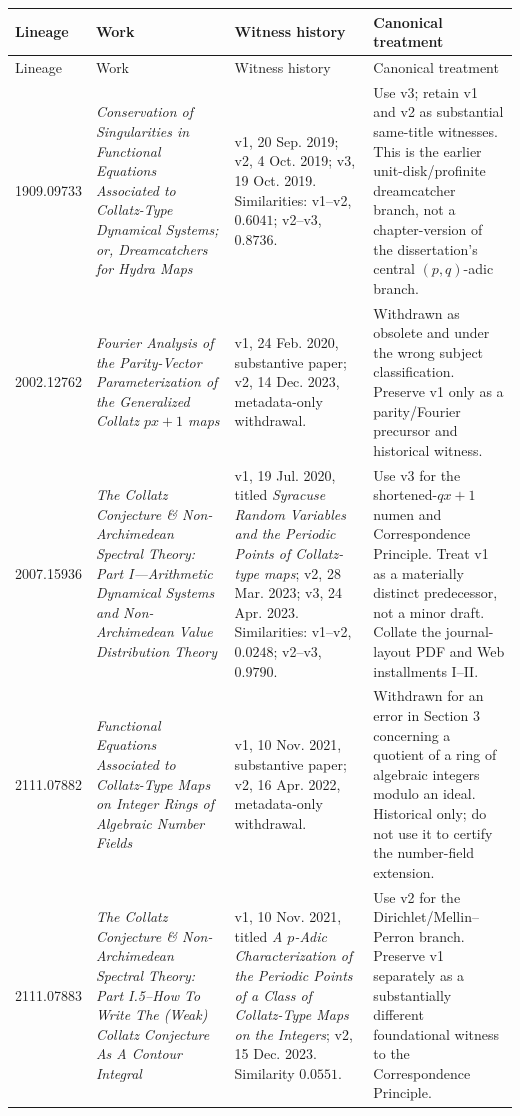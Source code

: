 \begingroup\small
\setlength{\tabcolsep}{3pt}
\begin{longtable}{@{}p{}p{}p{}p{}@{}}
\toprule
Lineage & Work & Witness history & Canonical treatment\\
\midrule
\endfirsthead
\toprule
Lineage & Work & Witness history & Canonical treatment\\
\midrule
\endhead
1909.09733 & \emph{Conservation of Singularities in Functional Equations Associated to Collatz-Type Dynamical Systems; or, Dreamcatchers for Hydra Maps}
& v1, 20 Sep. 2019; v2, 4 Oct. 2019; v3, 19 Oct. 2019.  Similarities: v1--v2, $0.6041$; v2--v3, $0.8736$.
& Use v3; retain v1 and v2 as substantial same-title witnesses.  This is the earlier unit-disk/profinite dreamcatcher branch, not a chapter-version of the dissertation's central $(p,q)$-adic branch.\\

2002.12762 & \emph{Fourier Analysis of the Parity-Vector Parameterization of the Generalized Collatz $px+1$ maps}
& v1, 24 Feb. 2020, substantive paper; v2, 14 Dec. 2023, metadata-only withdrawal.
& Withdrawn as obsolete and under the wrong subject classification.  Preserve v1 only as a parity/Fourier precursor and historical witness.\\

2007.15936 & \emph{The Collatz Conjecture \& Non-Archimedean Spectral Theory: Part I---Arithmetic Dynamical Systems and Non-Archimedean Value Distribution Theory}
& v1, 19 Jul. 2020, titled \emph{Syracuse Random Variables and the Periodic Points of Collatz-type maps}; v2, 28 Mar. 2023; v3, 24 Apr. 2023.  Similarities: v1--v2, $0.0248$; v2--v3, $0.9790$.
& Use v3 for the shortened-$qx+1$ numen and Correspondence Principle.  Treat v1 as a materially distinct predecessor, not a minor draft.  Collate the journal-layout PDF and Web installments I--II.\\

2111.07882 & \emph{Functional Equations Associated to Collatz-Type Maps on Integer Rings of Algebraic Number Fields}
& v1, 10 Nov. 2021, substantive paper; v2, 16 Apr. 2022, metadata-only withdrawal.
& Withdrawn for an error in Section 3 concerning a quotient of a ring of algebraic integers modulo an ideal.  Historical only; do not use it to certify the number-field extension.\\

2111.07883 & \emph{The Collatz Conjecture \& Non-Archimedean Spectral Theory: Part I.5--How To Write The (Weak) Collatz Conjecture As A Contour Integral}
& v1, 10 Nov. 2021, titled \emph{A $p$-Adic Characterization of the Periodic Points of a Class of Collatz-Type Maps on the Integers}; v2, 15 Dec. 2023.  Similarity $0.0551$.
& Use v2 for the Dirichlet/Mellin--Perron branch.  Preserve v1 separately as a substantially different foundational witness to the Correspondence Principle.\\


\end{longtable}
